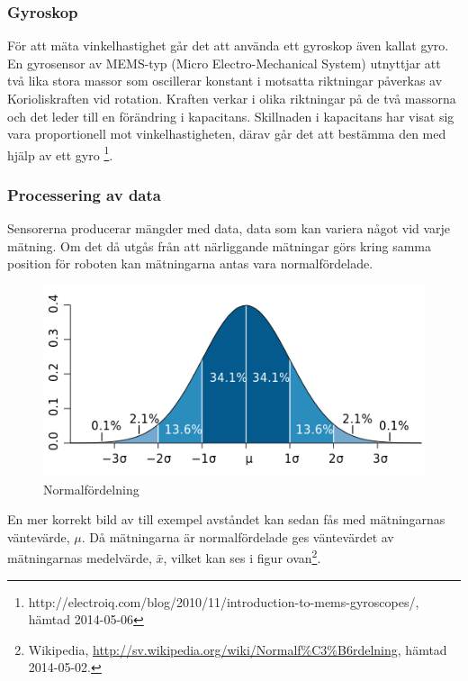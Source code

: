 \documentclass[a4paper,12pt,fleqn]{article}
\begin{document}
\subsubsection{Gyroskop}

För att mäta vinkelhastighet går det att använda ett gyroskop även kallat gyro. En gyrosensor av MEMS-typ (Micro Electro-Mechanical System) utnyttjar att två lika stora massor som oscillerar konstant i motsatta riktningar påverkas av Korioliskraften vid rotation. Kraften verkar i olika riktningar på de två massorna och det leder till en förändring i kapacitans.
Skillnaden i kapacitans har visat sig vara proportionell mot vinkelhastigheten, därav går det att bestämma den med hjälp av ett gyro \footnote{http://electroiq.com/blog/2010/11/introduction-to-mems-gyroscopes/, hämtad 2014-05-06}.

\subsubsection{Processering av data}

Sensorerna producerar mängder med data, data som kan variera något vid varje mätning. Om det då utgås från att närliggande mätningar görs kring samma position för roboten kan mätningarna antas vara normalfördelade.

\begin{figure}[htp] %
  \begin{center}
  \includegraphics[keepaspectratio=true,scale=0.5]{normalfordelning.png}  %
  \end{center}
  \caption{Normalfördelning} %
  \label{fig:fire} %
\end{figure}

En mer korrekt bild av till exempel avståndet kan sedan fås med mätningarnas väntevärde, $\mu$. Då mätningarna är normalfördelade ges väntevärdet av mätningarnas medelvärde, $\bar{x}$, vilket kan ses i figur ovan\footnote{Wikipedia, \url{http://sv.wikipedia.org/wiki/Normalf\%C3\%B6rdelning}, hämtad 2014-05-02.}. 
\end{document}
